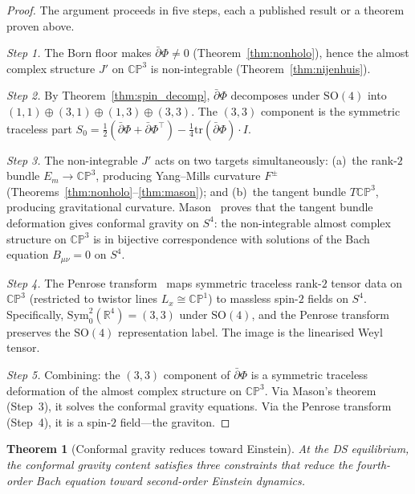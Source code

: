 \documentclass[11pt,a4paper]{article}
\newtheorem{theorem}{Theorem}[section]
\theoremstyle{definition}
\theoremstyle{remark}
\newcommand{\CP}{\mathbb{CP}}
\newcommand{\R}{\mathbb{R}}
\newcommand{\dbar}{\bar{\partial}}
\begin{document}
\begin{proof}
The argument proceeds in five steps, each a published result or a theorem proven above.

\emph{Step 1.} The Born floor makes $\dbar\Phi\neq 0$ (Theorem~\ref{thm:nonholo}), hence the almost complex structure $J'$ on $\CP^3$ is non-integrable (Theorem~\ref{thm:nijenhuis}).

\emph{Step 2.} By Theorem~\ref{thm:spin_decomp}, $\dbar\Phi$ decomposes under $\mathrm{SO}(4)$ into $(1,1)\oplus(3,1)\oplus(1,3)\oplus(3,3)$. The $(3,3)$ component is the symmetric traceless part $S_0=\frac{1}{2}(\dbar\Phi+\dbar\Phi^\top)-\frac{1}{4}\mathrm{tr}(\dbar\Phi)\cdot I$.

\emph{Step 3.} The non-integrable $J'$ acts on two targets simultaneously: (a)~the rank-$2$ bundle $E_m\to\CP^3$, producing Yang--Mills curvature $F^\pm$ (Theorems~\ref{thm:nonholo}--\ref{thm:mason}); and (b)~the tangent bundle $T\CP^3$, producing gravitational curvature. Mason~\cite{Mason2005} proves that the tangent bundle deformation gives conformal gravity on $S^4$: the non-integrable almost complex structure on $\CP^3$ is in bijective correspondence with solutions of the Bach equation $B_{\mu\nu}=0$ on $S^4$.

\emph{Step 4.} The Penrose transform~\cite{AHS1978,LeBrunMason} maps symmetric traceless rank-$2$ tensor data on $\CP^3$ (restricted to twistor lines $L_x\cong\CP^1$) to massless spin-$2$ fields on $S^4$. Specifically, $\mathrm{Sym}^2_0(\R^4)=(3,3)$ under $\mathrm{SO}(4)$, and the Penrose transform preserves the $\mathrm{SO}(4)$ representation label. The image is the linearised Weyl tensor.

\emph{Step 5.} Combining: the $(3,3)$ component of $\dbar\Phi$ is a symmetric traceless deformation of the almost complex structure on $\CP^3$. Via Mason's theorem (Step~3), it solves the conformal gravity equations. Via the Penrose transform (Step~4), it is a spin-$2$ field---the graviton.
\end{proof}

\begin{theorem}[Conformal gravity reduces toward Einstein]\label{thm:bach_to_einstein}
At the DS equilibrium, the conformal gravity content satisfies three constraints that reduce the fourth-order Bach equation toward second-order Einstein dynamics.
\end{theorem}
\end{document}
